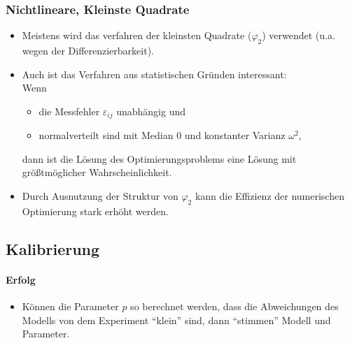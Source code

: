             \subsubsection{Nichtlineare, Kleinste Quadrate} %
                \begin{itemize}
                	\item Meistens wird das verfahren der kleinsten Quadrate (\( \varphi _ 2 \)) verwendet (u.a. wegen der Differenzierbarkeit).
                	\item Auch ist das Verfahren aus statistischen Gründen interessant: \\ Wenn
                    	\begin{itemize}
                    		\item die Messfehler \( \varepsilon _ {ij} \) unabhängig und
                    		\item normalverteilt sind mit Median \(0\) und konstanter Varianz \( \omega^2 \),
                    	\end{itemize}
                    	dann ist die Lösung des Optimierungsproblems eine Lösung mit größtmöglicher Wahrscheinlichkeit.
                    \item Durch Ausnutzung der Struktur von \( \varphi _ 2 \) kann die Effizienz der numerischen Optimierung stark erhöht werden.
                \end{itemize}

        \subsection{Kalibrierung} %
            \paragraph{Erfolg}
                \begin{itemize}
                	\item Können die Parameter \(p\) so berechnet werden, dass die Abweichungen des Modells von dem Experiment \enquote{klein} sind, dann \enquote{stimmen} Modell und Parameter.
            	\end{itemize}
            
